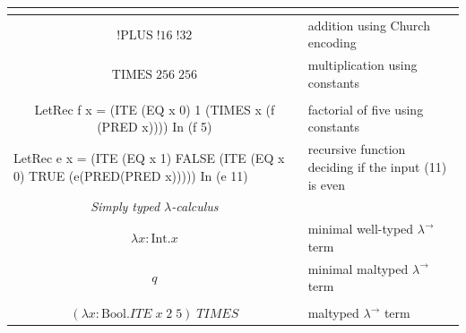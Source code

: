 \documentclass[table, a4paper, 10pt]{book}
\begin{document}
\begin{table}[H]
\begin{tabular}{cl}
\multicolumn{1}{|c|}{}                                                                                              & \multicolumn{1}{l|}{}                                                        \\ \hline
\multicolumn{1}{|c|}{$!\mathrm{PLUS}\;!\mathrm{16}\;!\mathrm{32}$}                                                  & \multicolumn{1}{l|}{addition using Church encoding}                          \\ \hline
\multicolumn{1}{|c|}{$\mathrm{TIMES}\;\mathrm{256}\;\mathrm{256}$}                                                  & \multicolumn{1}{l|}{multiplication using constants}                          \\ \hline
\multicolumn{1}{|c|}{}                                                                                              & \multicolumn{1}{l|}{}                                                        \\ \hline
\multicolumn{1}{|c|}{\scriptsize LetRec f x = (ITE (EQ x 0) 1 (TIMES x (f (PRED x)))) In (f 5)}                     & \multicolumn{1}{l|}{factorial of five using constants}                       \\ \hline
\multicolumn{1}{|l|}{\scriptsize LetRec e x = (ITE (EQ x 1) FALSE (ITE (EQ x 0) TRUE (e(PRED(PRED x))))) In (e 11)} & \multicolumn{1}{l|}{recursive function deciding if the input (11) is even}   \\ \hline
\multicolumn{1}{|c|}{\scriptsize \textit{Simply typed $\lambda$-calculus}}                                          & \multicolumn{1}{l|}{}                                                        \\ \hline
\multicolumn{1}{|c|}{$\lambda x:\mathrm{Int}.x$}                                                                    & \multicolumn{1}{l|}{minimal well-typed $\lambda^\to$ term}                   \\ \hline
\multicolumn{1}{|c|}{$q$}                                                                                           & \multicolumn{1}{l|}{minimal maltyped $\lambda^\to$ term}                     \\ \hline
\multicolumn{1}{|l|}{}                                                                                              & \multicolumn{1}{l|}{}                                                        \\ \hline
\multicolumn{1}{|c|}{$(\lambda x:\mathrm{Bool}.\mathit{ITE}\;x\;\mathit{2}\;\mathit{5})\;\mathit{TIMES}$}           & \multicolumn{1}{l|}{maltyped $\lambda^\to$ term}                             \\ \hline

\end{tabular}
\end{table}
\end{document}
